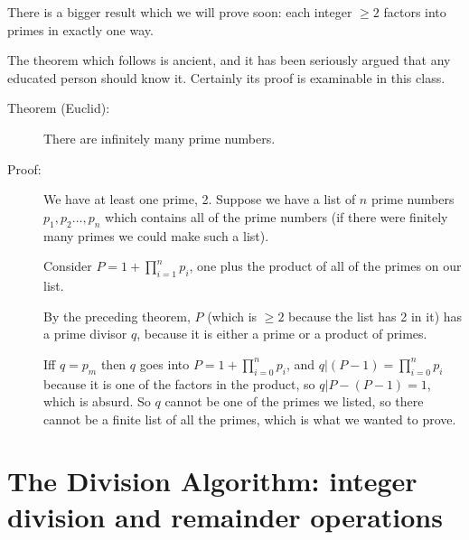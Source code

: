 \documentclass[12pt]{article}
\begin{document}
There is a bigger result which we will prove soon:  each integer $\geq 2$ factors into primes in exactly one way.

The theorem which follows is ancient, and it has been seriously argued that any educated person should know it.  Certainly its proof is examinable in this class.

\begin{description}

\item[Theorem (Euclid):]  There are infinitely many prime numbers.

\item[Proof:]   We have at least one prime, 2.  Suppose we have a list of $n$ prime numbers $p_1,p_2\ldots,p_n$ which contains all of the prime numbers (if there were finitely many primes we could make such a list).

Consider $P = 1+\prod_{i=1}^n p_i$, one plus the product of all of the primes on our list.

By the preceding theorem, $P$ (which is $\geq 2$ because the list has 2 in it) has a prime divisor $q$, because it is either a prime or a product of primes.

Iff $q=p_m$ then $q$ goes into $P = 1+\prod_{i=0}^n p_i$,
and $q | (P-1) = \prod_{i=0}^n p_i$ because it is one of the factors in the product, so $q | P - (P-1) = 1$, which is absurd.  So $q$ cannot be one of the primes we listed, so there cannot be a finite list of all the primes, which is what we wanted to prove.

\end{description}

\section{The Division Algorithm:  integer division and remainder operations}
\end{document}
